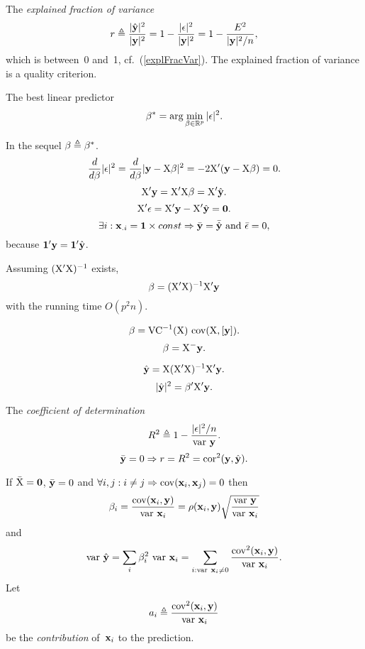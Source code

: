 \documentclass[10pt,a4paper]{article}
\theoremstyle{plain} \newtheorem{Lem}{Lemma}
\begin{document}
The {\em explained fraction of variance}
$$ r \triangleq \frac {|\hat {\mathbf y}|^2} {|\mathbf y|^2} = 1 - \frac {|\mathbf \epsilon|^2} {|\mathbf y|^2} = 1 - \frac {E^2} {|\mathbf y|^2 / n}, $$
which is between~0 and~1, cf.~(\ref{explFracVar}).
The explained fraction of variance is a quality criterion.

The best linear predictor
\begin{equation} \label{betaOpt}
  \mathbf \beta^* = \arg \min_{\mathbf \beta \in \mathbb R^p} |\mathbf \epsilon|^2.
\end{equation}

In the sequel $\mathbf \beta \triangleq \mathbf \beta^*$.
$$ \frac d {d \mathbf \beta} |\mathbf \epsilon|^2 = \frac d {d \mathbf \beta} |\mathbf y - \mathrm X \mathbf \beta|^2 = - 2 \mathrm X' (\mathbf y - \mathrm X \mathbf \beta) = 0. $$
$$ \mathrm X' \mathbf y = \mathrm X' \mathrm X \mathbf \beta = \mathrm X' \hat {\mathbf y}. $$
$$ \mathrm X' \mathbf \epsilon = \mathrm X' \mathbf y - \mathrm X' \hat {\mathbf y} = \mathbf 0. $$
$$ \exists i : \mathbf x_{. i} = \mathbf 1 \times const \Rightarrow \bar{\mathbf y} = \bar{\hat {\mathbf y}} \text{ and } \bar{\mathbf \epsilon} = 0, $$
because $\mathbf 1' \mathbf y = \mathbf 1' \hat {\mathbf y}$.

Assuming $(\mathrm X' \mathrm X)^{-1}$ exists,
\begin{equation} \label{betaL2}
  \mathbf \beta = (\mathrm X' \mathrm X)^{-1} \mathrm X' \mathbf y
\end{equation}
with the running time $O(p^2 n)$.

\begin{equation} \label{betaL2_stat}
   \mathbf \beta = \mathrm {VC}^{-1} (\mathrm X) \ \mathrm {cov}(\mathrm X,[\mathbf y]).
\end{equation}
$$ \mathbf \beta = \mathrm X^- \mathbf y. $$

$$ \hat {\mathbf y} = \mathrm X (\mathrm X' \mathrm X)^{-1} \mathrm X' \mathbf y. $$
$$ |\hat {\mathbf y}|^2 = \mathbf \beta' \mathrm X' \mathbf y. $$

The {\em coefficient of determination}
$$ R^2 \triangleq 1 - \frac {|\mathbf \epsilon|^2 / n} {\mathrm {var} \  \mathbf y}. $$
$$ \bar {\mathbf y} = 0 \Rightarrow r = R^2 = \mathrm {cor}^2 (\mathbf y, \hat {\mathbf y}). $$

If $\bar {\mathrm X} = \mathbf 0$, $\bar {\mathbf y} = 0$ and $\forall i, j: i \ne j \Rightarrow \mathrm {cov}(\mathbf x_i, \mathbf x_j) = 0$ then
\begin{equation} \label{betaIndep}
\beta_i = \frac {\mathrm {cov} (\mathbf x_i, \mathbf y)} {\mathrm {var} \  \mathbf x_i} = \rho(\mathbf x_i, \mathbf y) \sqrt{\frac {\mathrm {var} \  \mathbf y} {\mathrm {var} \  \mathbf x_i}}
\end{equation}
and
$$ \mathrm {var} \  \hat {\mathbf y} = \sum_i \beta_i^2 \ \mathrm {var} \  \mathbf x_i = \sum_{i : \mathrm {var} \  \mathbf x_i \ne 0} \frac {\mathrm {cov}^2 (\mathbf x_i, \mathbf y)} {\mathrm {var} \  \mathbf x_i}. $$
Let
$$ a_i \triangleq \frac {\mathrm {cov}^2 (\mathbf x_i, \mathbf y)} {\mathrm {var} \  \mathbf x_i} $$
be the {\em contribution} of~$\mathbf x_i$ to the prediction.
\end{document}
